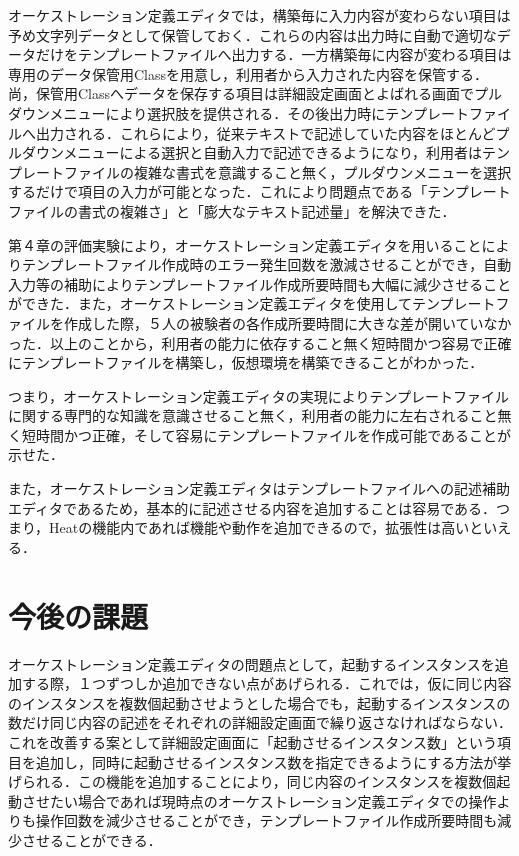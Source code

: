 \documentclass[mingoth]{kut-paper}		%
\begin{document}
	オーケストレーション定義エディタでは，構築毎に入力内容が変わらない項目は予め文字列データとして保管しておく．これらの内容は出力時に自動で適切なデータだけをテンプレートファイルへ出力する．一方構築毎に内容が変わる項目は専用のデータ保管用Classを用意し，利用者から入力された内容を保管する．尚，保管用Classへデータを保存する項目は詳細設定画面とよばれる画面でプルダウンメニューにより選択肢を提供される．その後出力時にテンプレートファイルへ出力される．これらにより，従来テキストで記述していた内容をほとんどプルダウンメニューによる選択と自動入力で記述できるようになり，利用者はテンプレートファイルの複雑な書式を意識すること無く，プルダウンメニューを選択するだけで項目の入力が可能となった．これにより問題点である「テンプレートファイルの書式の複雑さ」と「膨大なテキスト記述量」を解決できた．
	
	第４章の評価実験により，オーケストレーション定義エディタを用いることによりテンプレートファイル作成時のエラー発生回数を激減させることができ，自動入力等の補助によりテンプレートファイル作成所要時間も大幅に減少させることができた．また，オーケストレーション定義エディタを使用してテンプレートファイルを作成した際，５人の被験者の各作成所要時間に大きな差が開いていなかった．以上のことから，利用者の能力に依存すること無く短時間かつ容易で正確にテンプレートファイルを構築し，仮想環境を構築できることがわかった．
	
	つまり，オーケストレーション定義エディタの実現によりテンプレートファイルに関する専門的な知識を意識させること無く，利用者の能力に左右されること無く短時間かつ正確，そして容易にテンプレートファイルを作成可能であることが示せた．
	
	また，オーケストレーション定義エディタはテンプレートファイルへの記述補助エディタであるため，基本的に記述させる内容を追加することは容易である．つまり，Heatの機能内であれば機能や動作を追加できるので，拡張性は高いといえる．
	\section{今後の課題}
	オーケストレーション定義エディタの問題点として，起動するインスタンスを追加する際，１つずつしか追加できない点があげられる．これでは，仮に同じ内容のインスタンスを複数個起動させようとした場合でも，起動するインスタンスの数だけ同じ内容の記述をそれぞれの詳細設定画面で繰り返さなければならない．これを改善する案として詳細設定画面に「起動させるインスタンス数」という項目を追加し，同時に起動させるインスタンス数を指定できるようにする方法が挙げられる．この機能を追加することにより，同じ内容のインスタンスを複数個起動させたい場合であれば現時点のオーケストレーション定義エディタでの操作よりも操作回数を減少させることができ，テンプレートファイル作成所要時間も減少させることができる．
	
\end{document}
